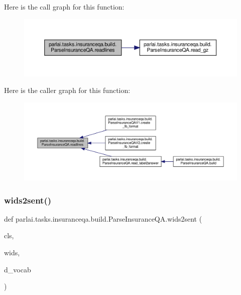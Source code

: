 Here is the call graph for this function\+:
\nopagebreak
\begin{figure}[H]
\begin{center}
\leavevmode
\includegraphics[width=350pt]{classparlai_1_1tasks_1_1insuranceqa_1_1build_1_1ParseInsuranceQA_af8b1135c593e04b80b602d717a3b30d3_cgraph}
\end{center}
\end{figure}
Here is the caller graph for this function\+:
\nopagebreak
\begin{figure}[H]
\begin{center}
\leavevmode
\includegraphics[width=350pt]{classparlai_1_1tasks_1_1insuranceqa_1_1build_1_1ParseInsuranceQA_af8b1135c593e04b80b602d717a3b30d3_icgraph}
\end{center}
\end{figure}
\mbox{\label{classparlai_1_1tasks_1_1insuranceqa_1_1build_1_1ParseInsuranceQA_afb5e7fdf077dea815bdd256c5a750069}} 
\subsubsection{\texorpdfstring{wids2sent()}{wids2sent()}}
{\footnotesize\ttfamily def parlai.\+tasks.\+insuranceqa.\+build.\+Parse\+Insurance\+Q\+A.\+wids2sent (\begin{DoxyParamCaption}\item[{}]{cls,  }\item[{}]{wids,  }\item[{}]{d\+\_\+vocab }\end{DoxyParamCaption})}



